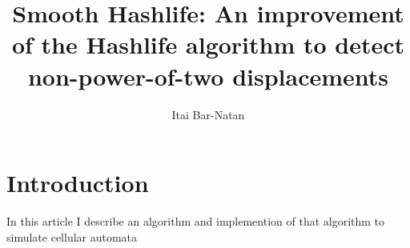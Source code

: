\documentclass{article}
\begin{document}
\title{Smooth Hashlife: An improvement of the Hashlife algorithm to detect
non-power-of-two displacements}
\author{Itai Bar-Natan}
\maketitle

\section{Introduction}

In this article I describe an algorithm and implemention of that algorithm to
simulate cellular automata
\end{document}
